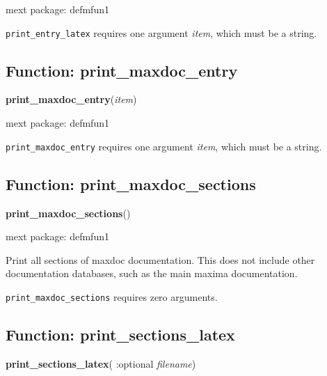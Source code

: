 \documentclass[]{article}
\begin{document}
\noindent mext package: defmfun1



\vspace{5 pt}
   {\tt print\_entry\_latex} requires one argument {\it item}, which must be a string.


\vspace{5 pt}


\subsection{Function: print\_maxdoc\_entry\label{sec:print_maxdoc_entry}}
\hypertarget{print_maxdoc_entry}{}
{\bf print\_maxdoc\_entry}({\it item})


\noindent mext package: defmfun1



\vspace{5 pt}
   {\tt print\_maxdoc\_entry} requires one argument {\it item}, which must be a string.


\vspace{5 pt}


\subsection{Function: print\_maxdoc\_sections\label{sec:print_maxdoc_sections}}
\hypertarget{print_maxdoc_sections}{}
{\bf print\_maxdoc\_sections}()


\noindent mext package: defmfun1



\vspace{5 pt}
Print all sections of maxdoc documentation. This does not include other documentation databases, such as the main maxima documentation. 

\vspace{5 pt}

   {\tt print\_maxdoc\_sections} requires zero arguments.


\vspace{5 pt}


\subsection{Function: print\_sections\_latex\label{sec:print_sections_latex}}
\hypertarget{print_sections_latex}{}
{\bf print\_sections\_latex}( :optional {\it filename})
\end{document}
